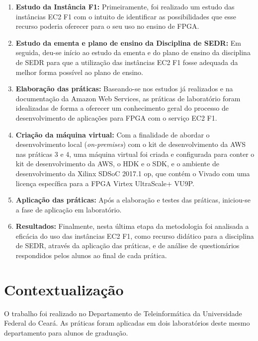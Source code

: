 \begin{enumerate}
    \item \textbf{Estudo da Instância F1:} Primeiramente, foi realizado um estudo das instâncias EC2 F1 com o intuito de identificar as possibilidades que esse recurso poderia oferecer para o seu uso no ensino de FPGA.
    
    \item \textbf{Estudo da ementa e plano de ensino da Disciplina de SEDR:} Em seguida, deu-se início ao estudo da ementa e do plano de ensino da disciplina de SEDR para que a utilização das instâncias EC2 F1 fosse adequada da melhor forma possível ao plano de ensino.
    
    \item \textbf{Elaboração das práticas:} Baseando-se nos estudos já realizados e na documentação da Amazon Web Services, as práticas de laboratório foram idealizadas de forma a oferecer um conhecimento geral do processo de desenvolvimento de aplicações para FPGA com o serviço EC2 F1.
    
     \item \textbf{Criação da máquina virtual:} Com a finalidade de abordar o desenvolvimento local (\textit{on-premises}) com o kit de desenvolvimento da AWS \cite{on-premises} nas práticas 3 e 4, uma máquina virtual foi criada e configurada para conter o kit de desenvolvimento da AWS, o HDK e o SDK, e o ambiente de desenvolvimento da Xilinx SDSoC 2017.1 op, que contém o Vivado com uma licença específica para a FPGA Virtex UltraScale+ VU9P.
    
    \item \textbf{Aplicação das práticas:} Após a elaboração e testes das práticas, iniciou-se a fase de aplicação em laboratório.
    
    \item \textbf{Resultados:} Finalmente, nesta última etapa da metodologia foi analisada a eficácia do uso das instâncias EC2 F1, como recurso didático para a disciplina de SEDR, através da aplicação das práticas, e de análise de questionários respondidos pelos alunos ao final de cada prática.
	  
\end{enumerate}

  
\section{Contextualização}\label{sec: contextualizacao}

O trabalho foi realizado no Departamento de Teleinformática da Universidade Federal do Ceará. As práticas foram aplicadas em dois laboratórios deste mesmo departamento para alunos de graduação.

